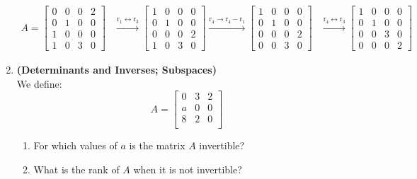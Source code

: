 \documentclass[red]{tutorial}
\newcommand{\row}[1]{\mathrm{r}_{#1}}
\theoremstyle{definition}
\theoremstyle{theorem}
\begin{document}
\begin{tutorial}
\begin{enumerate}
\begin{align*}
        A = \begin{bmatrix}
          0 & 0 & 0 & 2 \\
          0 & 1 & 0 & 0 \\
          1 & 0 & 0 & 0 \\
          1 & 0 & 3 & 0
        \end{bmatrix}
        &\xrightarrow{\row{1} \leftrightarrow \row{3}}
        \begin{bmatrix}
          1 & 0 & 0 & 0 \\
          0 & 1 & 0 & 0 \\
          0 & 0 & 0 & 2 \\
          1 & 0 & 3 & 0
        \end{bmatrix}
        \xrightarrow{\row{4} \to \row{4}-\row{1}}
        \begin{bmatrix}
          1 & 0 & 0 & 0 \\
          0 & 1 & 0 & 0 \\
          0 & 0 & 0 & 2 \\
          0 & 0 & 3 & 0
        \end{bmatrix}
        &\xrightarrow{\row{4} \leftrightarrow \row{3}}
        \begin{bmatrix}
          1 & 0 & 0 & 0 \\
          0 & 1 & 0 & 0 \\
          0 & 0 & 3 & 0 \\
          0 & 0 & 0 & 2
        \end{bmatrix}
        &&
      \end{align*}
    \item \textbf{(Determinants and Inverses; Subspaces)}\\
      We define:
      \begin{equation*}
        A = 
        \begin{bmatrix}
          0 & 3 & 2 \\
          a & 0 & 0 \\
          8 & 2 & 0 \\
        \end{bmatrix}
      \end{equation*}
      \begin{enumerate}
        \item For which values of $a$ is 
          the matrix $A$ invertible? 
        \item What is the rank of $A$ when it is not invertible?

\end{enumerate}
\end{enumerate}
\end{tutorial}
\end{document}
